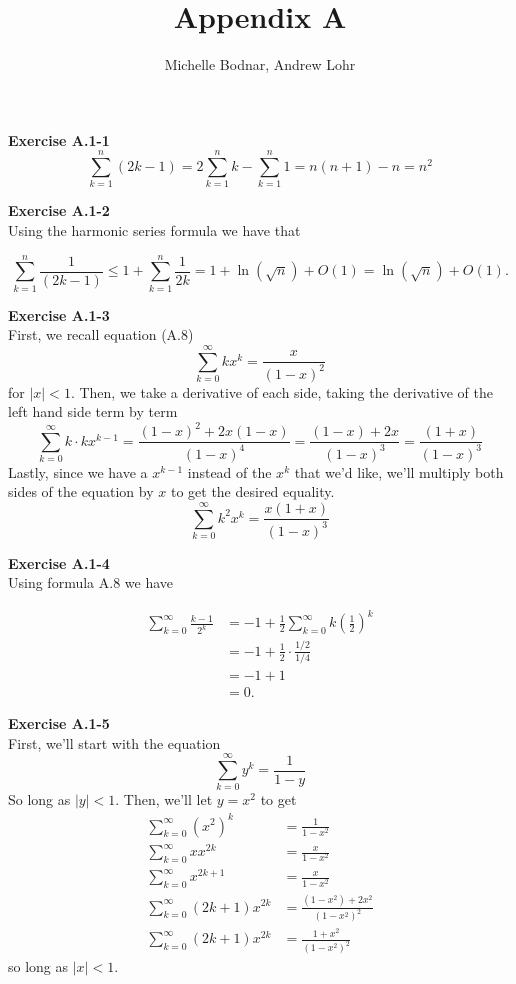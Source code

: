 \documentclass{article}
\title{Appendix A}
\author{Michelle Bodnar, Andrew Lohr}
\begin{document}
\maketitle

\noindent\textbf{Exercise A.1-1}\\

\[
\sum_{k=1}^{n} (2k -1) = 2\sum_{k=1}^{n} k - \sum_{k=1}^n 1 = n(n+1) - n = n^2
\]


\noindent\textbf{Exercise A.1-2}\\

Using the harmonic series formula we have that

\[\sum_{k=1}^n \frac{1}{(2k-1)} \leq 1 + \sum_{k=1}^n \frac{1}{2k} =  1 + \ln(\sqrt{n}) + O(1) =  \ln(\sqrt{n}) + O(1).\]

\noindent\textbf{Exercise A.1-3}\\
First, we recall equation (A.8)
\[
\sum_{k=0}^\infty k x^k = \frac{x}{(1-x)^2}
\]
for $|x|<1$. Then, we take a derivative of each side, taking the derivative of the left hand side term by term
\[
\sum_{k=0}^\infty k\cdot kx^{k-1} = \frac{(1-x)^2 + 2x (1-x)}{(1-x)^4} = \frac{(1-x) + 2x}{(1-x)^3} = \frac{(1+x)}{(1-x)^3}
\]
Lastly, since we have a $x^{k-1}$ instead of the $x^k$ that we'd like, we'll multiply both sides of the equation by $x$ to get the desired equality.
\[
\sum_{k=0}^\infty k^2 x^k = \frac{x(1+x)}{(1-x)^3}
\]

\noindent\textbf{Exercise A.1-4}\\

Using formula A.8 we have

\begin{align*}
\sum_{k=0}^\infty \frac{k-1}{2^k} &= -1 + \frac{1}{2} \sum_{k=0}^\infty k\left(\frac{1}{2}\right)^k \\
&= -1 + \frac{1}{2} \cdot \frac{ 1/2}{1/4} \\
&= -1 + 1 \\
&= 0.
\end{align*}

\noindent\textbf{Exercise A.1-5}\\

First, we'll start with the equation 
\[
\sum_{k=0}^\infty y^k = \frac{1}{1-y}
\]
So long as $|y|<1$. Then, we'll let $y = x^2$ to get 
\begin{align*}
\sum_{k=0}^\infty (x^2)^k &= \frac{1}{1-x^2}\\
\sum_{k=0}^\infty xx^{2k} &= \frac{x}{1-x^2}\\
\sum_{k=0}^\infty x^{2k+1} &= \frac{x}{1-x^2}\\
\sum_{k=0}^\infty (2k+1) x^{2k} &= \frac{(1-x^2) +2 x^2 }{(1-x^2)^2}\\
\sum_{k=0}^\infty (2k+1) x^{2k} &= \frac{1 +x^2 }{(1-x^2)^2}
\end{align*}
so long as $|x|<1$.\\
\end{document}
